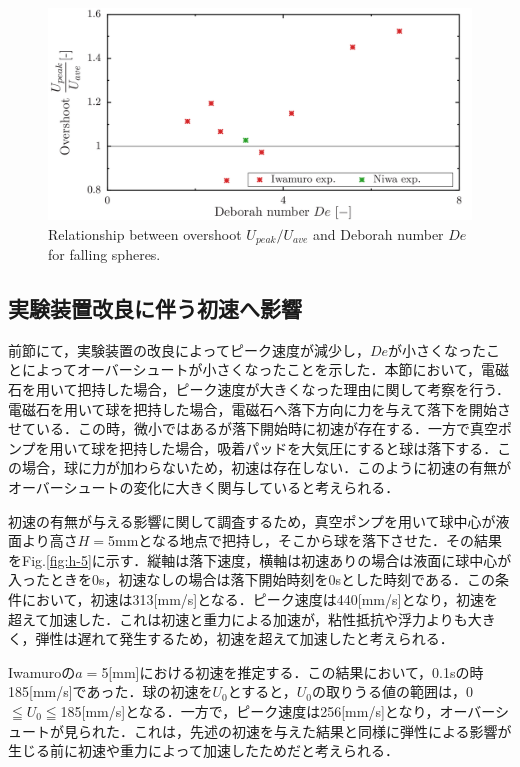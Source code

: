 \begin{figure}[ht]
    \begin{center}
        \includegraphics[width=15cm,clip]{5-Discussion/De-overshoot.png}
        \caption{Relationship between overshoot $U_{peak}/U_{ave}$ and Deborah number $De$ for falling spheres.}
        \label{fig:De-overshoot}
    \end{center}
\end{figure}

\clearpage

\subsection{実験装置改良に伴う初速へ影響}

前節にて，実験装置の改良によってピーク速度が減少し，$De$が小さくなったことによってオーバーシュートが小さくなったことを示した．本節において，電磁石を用いて把持した場合，ピーク速度が大きくなった理由に関して考察を行う．電磁石を用いて球を把持した場合，電磁石へ落下方向に力を与えて落下を開始させている．この時，微小ではあるが落下開始時に初速が存在する．一方で真空ポンプを用いて球を把持した場合，吸着パッドを大気圧にすると球は落下する．この場合，球に力が加わらないため，初速は存在しない．このように初速の有無がオーバーシュートの変化に大きく関与していると考えられる．

初速の有無が与える影響に関して調査するため，真空ポンプを用いて球中心が液面より高さ$H=$5mmとなる地点で把持し，そこから球を落下させた．その結果をFig.\ref{fig:h-5}に示す．縦軸は落下速度，横軸は初速ありの場合は液面に球中心が入ったときを0s，初速なしの場合は落下開始時刻を0sとした時刻である．この条件において，初速は313[mm/s]となる．ピーク速度は440[mm/s]となり，初速を超えて加速した．これは初速と重力による加速が，粘性抵抗や浮力よりも大きく，弾性は遅れて発生するため，初速を超えて加速したと考えられる．

Iwamuro\cite{ref:9}の$a =$5[mm]における初速を推定する．この結果において，0.1sの時185[mm/s]であった．球の初速を$U_0$とすると，$U_0$の取りうる値の範囲は，0$\leqq U_0 \leqq$185[mm/s]となる．一方で，ピーク速度は256[mm/s]となり，オーバーシュートが見られた．これは，先述の初速を与えた結果と同様に弾性による影響が生じる前に初速や重力によって加速したためだと考えられる．

